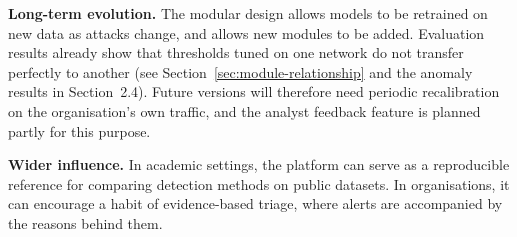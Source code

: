 \textbf{Long-term evolution.} The modular design allows models to be retrained on new data as attacks change, and allows new modules to be added. Evaluation results already show that thresholds tuned on one network do not transfer perfectly to another (see Section~\ref{sec:module-relationship} and the anomaly results in Section~2.4). Future versions will therefore need periodic recalibration on the organisation's own traffic, and the analyst feedback feature is planned partly for this purpose.

\textbf{Wider influence.} In academic settings, the platform can serve as a reproducible reference for comparing detection methods on public datasets. In organisations, it can encourage a habit of evidence-based triage, where alerts are accompanied by the reasons behind them.
